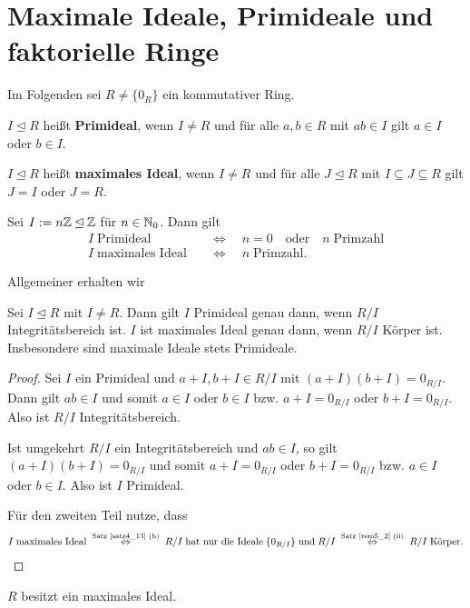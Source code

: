 \section{Maximale Ideale, Primideale und faktorielle Ringe}
Im Folgenden sei $R \neq \{0_R\}$ ein kommutativer Ring.
\begin{definition}
	$I \unlhd R$ heißt \textbf{Primideal}, wenn $I \neq R$ und für alle $a,b \in R$ mit $ab \in I$ gilt $a \in I$ oder $b \in I$.
	
	$I \unlhd R$ heißt \textbf{maximales Ideal}, wenn $I \neq R$ und für alle $J \unlhd R$ mit $I \subseteq J \subseteq R$ gilt $J = I$ oder $J = R$.
\end{definition}
\begin{beispiel}\label{beispiel6_2}
	Sei $I := n\mathbb{Z} \unlhd \mathbb{Z}$ für $n \in \mathbb{N}_0$. Dann gilt
	\begin{align*}
		I \;\text{Primideal} \quad&\Leftrightarrow\quad n = 0 \quad\text{oder}\quad n \;\text{Primzahl}\\
		I \;\text{maximales Ideal} \quad&\Leftrightarrow\quad n \;\text{Primzahl}.
	\end{align*}
\end{beispiel}
Allgemeiner erhalten wir
\begin{prop}\label{prop6_3}
	Sei $I \unlhd R$ mit $I \neq R$. Dann gilt $I$ Primideal genau dann, wenn $R/I$ Integritätsbereich ist. $I$ ist maximales Ideal genau dann, wenn $R/I$ Körper ist. Insbesondere sind maximale Ideale stets Primideale.
\end{prop}
\begin{proof}
	Sei $I$ ein Primideal und $a + I, b + I \in R/I$ mit $(a+I)(b+I) = 0_{R/I}$. Dann gilt $ab \in I$ und somit $a \in I$ oder $b \in I$ bzw. $a + I = 0_{R/I}$ oder $b + I = 0_{R/I}$. Also ist $R/I$ Integritätsbereich.
	
	Ist umgekehrt $R/I$ ein Integritätsbereich und $ab \in I$, so gilt $(a+I)(b+I) = 0_{R/I}$ und somit $a + I = 0_{R/I}$ oder $b+I = 0_{R/I}$ bzw. $a \in I$ oder $b \in I$. Also ist $I$ Primideal.
	
	Für den zweiten Teil nutze, dass
	\[I\;\text{maximales Ideal} \;\overset{\text{Satz \ref{satz4_13} (b)}}{\Leftrightarrow}\; R/I \; \text{hat nur die Ideale}\;\{0_{R/I}\}\;\text{und}\;R/I \;\overset{\text{Satz \ref{rem5_2} (ii)}}{\Leftrightarrow}\; R/I \;\text{Körper}.\]
\end{proof}
\begin{satz}\label{satz6_4}
	$R$ besitzt ein maximales Ideal.
\end{satz}

